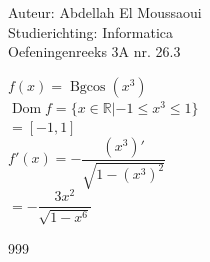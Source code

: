\documentclass[a4paper]{article}
\begin{document}
  
\noindent \large Auteur: Abdellah El Moussaoui \\
\noindent \large Studierichting: Informatica\\
\noindent \large Oefeningenreeks 3A nr. 26.3\\

\medskip

\normalsize

$f(x)=\operatorname{Bgcos}\left(x^3\right)$\\

$\operatorname{Dom}f=\{x\in \mathbb{R} | -1\leq x^3 \leq1\}$\\

$= [-1,1]$\\

$f'(x)=-\dfrac{\left(x^3\right)'}{\sqrt{1-\left(x^3\right)^2}}$\\

$=-\dfrac{3x^2}{\sqrt{1-x^6}}$\\


\begin{thebibliography}{999}
\end{thebibliography}
\end{document}
